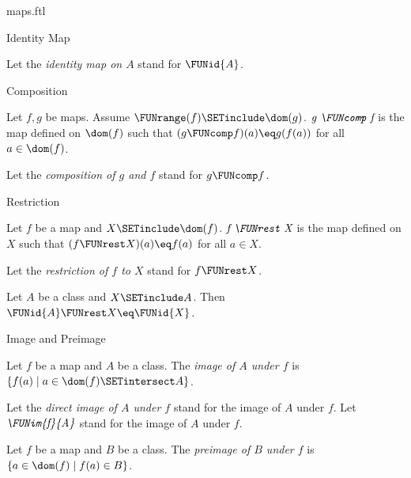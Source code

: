 \documentclass{naproche-library}
\begin{document}
\begin{smodule}[title=Maps]{maps.ftl}
\begin{sfragment}{Identity Map}
\begin{definition}[forthel,id=FOUNDATIONS_06_1920902360989696]
    Let the \emph{identity map on $A$} stand for $\FUNid{A}$.
  \end{definition}
\end{sfragment}

\begin{sfragment}{Composition}
  \begin{definition}[forthel,id=FOUNDATIONS_06_7605717729017856]
    Let $f, g$ be maps.
    Assume $\FUNrange(f) \SETinclude \dom(g)$.
    $\emph{g \FUNcomp f}$ is the map defined on $\dom(f)$ such that $(g \FUNcomp f)(a) \eq g(f(a))$ for all $a \in \dom(f)$.

    Let the \emph{composition of $g$ and $f$} stand for $g \FUNcomp f$.
  \end{definition}
\end{sfragment}

\begin{sfragment}{Restriction}
  \begin{definition}[forthel,id=FOUNDATIONS_06_7095412741636096]
    Let $f$ be a map and $X \SETinclude \dom(f)$.
    $\emph{f \FUNrest X}$ is the map defined on $X$ such that $(f \FUNrest X)(a) \eq f(a)$ for all $a \in X$.

    Let the \emph{restriction of $f$ to $X$} stand for $f \FUNrest X$.
  \end{definition}

  \begin{proposition}[forthel,id=FOUNDATIONS_06_2170189258948608]
    Let $A$ be a class and $X \SETinclude A$.
    Then $\FUNid{A} \FUNrest X \eq \FUNid{X}$.
  \end{proposition}
\end{sfragment}

\begin{sfragment}{Image and Preimage}
  \begin{definition}[forthel,id=FOUNDATIONS_06_3038237683613696]
    Let $f$ be a map and $A$ be a class.
    The \emph{image of $A$ under $f$} is $\{ f(a) \mid a \in \dom(f) \SETintersect A \}$.

    Let the \emph{direct image of $A$ under $f$} stand for the image of $A$ under $f$.
    Let $\emph{\FUNim{f}{A}}$ stand for the image of $A$ under $f$.
  \end{definition}

  \begin{definition}[forthel,id=FOUNDATIONS_06_4563167805964288]
    Let $f$ be a map and $B$ be a class.
    The \emph{preimage of $B$ under $f$} is $\{ a \in \dom(f) \mid f(a) \in B \}$.


\end{definition}
\end{sfragment}
\end{smodule}
\end{document}
